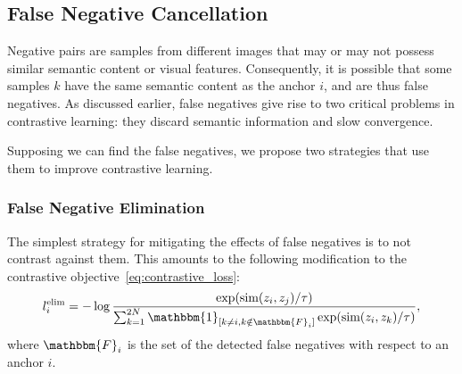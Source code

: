 \documentclass[10pt,twocolumn,letterpaper]{article}
\begin{document}
\subsection{False Negative Cancellation}
Negative pairs are samples from different images that may or may not possess similar semantic content or visual features. Consequently, it is possible that some samples $k$ have the same semantic content as the anchor $i$, and are thus false negatives. As discussed earlier, false negatives give rise to two critical problems in contrastive learning: they discard semantic information and slow convergence.



Supposing we can find the false negatives, we propose two strategies that use them to improve contrastive learning.

\subsubsection{False Negative Elimination}
The simplest strategy for mitigating the effects of false negatives is to not contrast against them. This amounts to the following modification to the contrastive objective~\eqref{eq:contrastive_loss}:
\begin{equation} \label{eq:elimination_loss}
l_{i}^\textrm{elim}=-\log\frac{\exp(\textrm{sim}(z_i,z_j)/\tau)}{\sum_{k=1}^{2N} \mathbbm{1}_{[k\ne i, k \notin \mathbbm{F}_i]}\exp(\textrm{sim}(z_i,z_k)/\tau)},
\end{equation}
where $\mathbbm{F}_i$ is the set of the detected false negatives with respect to an anchor $i$.
\end{document}
